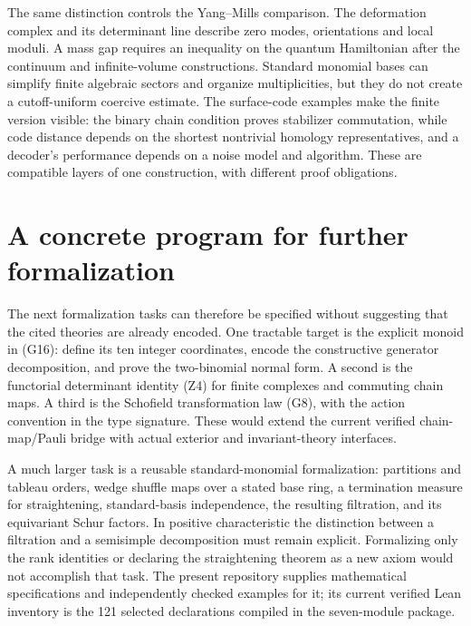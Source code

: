 The same distinction controls the Yang--Mills comparison. The deformation complex and its determinant line describe zero modes, orientations and local moduli. A mass gap requires an inequality on the quantum Hamiltonian after the continuum and infinite-volume constructions. Standard monomial bases can simplify finite algebraic sectors and organize multiplicities, but they do not create a cutoff-uniform coercive estimate. The surface-code examples make the finite version visible: the binary chain condition proves stabilizer commutation, while code distance depends on the shortest nontrivial homology representatives, and a decoder's performance depends on a noise model and algorithm. These are compatible layers of one construction, with different proof obligations.

\section{A concrete program for further formalization}
The next formalization tasks can therefore be specified without suggesting that the cited theories are already encoded. One tractable target is the explicit monoid in (G16): define its ten integer coordinates, encode the constructive generator decomposition, and prove the two-binomial normal form. A second is the functorial determinant identity (Z4) for finite complexes and commuting chain maps. A third is the Schofield transformation law (G8), with the action convention in the type signature. These would extend the current verified chain-map/Pauli bridge with actual exterior and invariant-theory interfaces.

A much larger task is a reusable standard-monomial formalization: partitions and tableau orders, wedge shuffle maps over a stated base ring, a termination measure for straightening, standard-basis independence, the resulting filtration, and its equivariant Schur factors. In positive characteristic the distinction between a filtration and a semisimple decomposition must remain explicit. Formalizing only the rank identities or declaring the straightening theorem as a new axiom would not accomplish that task. The present repository supplies mathematical specifications and independently checked examples for it; its current verified Lean inventory is the 121 selected declarations compiled in the seven-module package.
